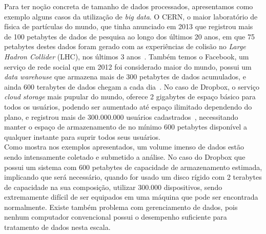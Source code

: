 	Para ter noção concreta de tamanho de dados processados, apresentamos como exemplo alguns casos da utilização de \textit{big data}. O CERN, o maior laboratório de física de partículas do mundo, que tinha anunciado em 2013 que registrou mais de 100 petabytes de dados de pesquisa ao longo dos últimos 20 anos, em que 75 petabytes destes dados foram gerado com as experiências de colisão no \textit{Large Hadron Collider} (LHC), nos últimos 3 anos~\cite{cern}. Também temos o Facebook, um serviço de rede social que em 2012 foi considerado maior do mundo, possui um \textit{data warehouse} que armazena mais de 300 petabytes de dados acumulados, e ainda 600 terabytes de dados chegam a cada dia~\cite{facebook14}. No caso de Dropbox, o serviço \textit{cloud storage} mais pupular do mundo, oferece 2 gigabytes de espaço básico para todos os usuários, podendo ser aumentado até espaço ilimitado dependendo do plano, e registrou mais de 300.000.000 usuários cadastrados~\cite{dropbox}, necessitando manter o espaço de armazenamento de no mínimo 600 petabytes disponível a qualquer instante para suprir todos seus usuários.\\
	
	Como mostra nos exemplos apresentados, um volume imenso de dados estão sendo intensamente coletado e submetido a análise. No caso do Dropbox que possui um sistema com 600 petabytes de capacidade de armazenamento estimada, implicando que será necessário, quando for usado um disco rígido com 2 terabytes de capacidade na sua composição, utilizar 300.000 dispositivos, sendo extremamente difícil de ser equipados em uma máquina que pode ser encontrada normalmente. Existe também problema com gerenciamento de dados, pois nenhum computador convencional possui o desempenho suficiente para tratamento de dados nesta escala. \\
	
